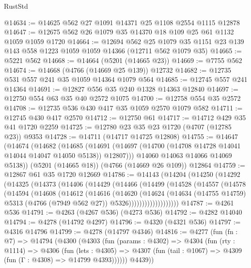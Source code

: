 \begin{lexlean}{RustStd}
\begin{coremodule}
{\begin{coremodule}
{{{{{{{{{{{{{{{{{{{{{{{{{{{{{{{{{{{@14634 := @14625 @562 @27 @1091 @14371 @25 @1108 @2554 @1115 @12878
@14647 := @12675 @562 @26 @1079 @35 @14370 @18 @109 @25 @61 @1132 @1059 @1059 @1720
@14664 := @12694
    @562
    @25
    @1079
    @35
    @1151
    @23
    @139
    @143
    @558
    @1223
    @1059
    @1059
    @14366
    (@12711 @562 @1079 @35)
@14665 := @5221 @562
@14668 := @14664 (@5201 (@14665 @23))
@14669 := @7755 @562
@14674 := @14668 (@4766 (@14669 @25 @139)) @12732
@14682 := @12735 @531 @557 @241 @35 @1059 @14364 @1079 @564
@14685 := @12745 @557 @241 @14364
@14691 := @12827 @556 @35 @240 @1328 @14363 @12840
@14697 := @12750 @554 @63 @35 @40 @2572 @1075
@14700 := @12758 @554 @35 @2572
@14708 := @12735 @536 @430 @417 @35 @1059 @2570 @1079 @582
@14711 := @12745 @430 @417 @2570
@14712 := @12750 @61
@14717 := @14712 @429 @35 @41 @1720 @2259
@14725 := @12780 @23 @35 @23 @1720 (@4707 (@12785 @23)) @9353
@14728 := @14711 (@14717 @14725 @12808)
@14755 := @14647
    (@14674
      (@14682
        (@14685 (@14691 (@14697 (@14700 (@14708 @14728 @14041 @14044 @14047 @14050 @5138)) @12807)))
        @14060
        @14063
        @14066
        @14069
        @5138))
    (@5201 (@14665 @18))
    (@4766 (@14669 @26 @109))
    @12864
@14759 := @12867 @61 @35 @1720 @12669
@14786 := @14143
    (@14204
      (@14250
        (@14292
          (@14325
            (@14373
              (@14406
                (@14429
                  (@14466
                    (@14499
                      (@14528
                        (@14557
                          (@14578
                            (@14594
                              (@14608
                                (@14612
                                  (@14616
                                    (@14620
                                      (@14624
                                        (@14634
                                          (@14755 @14759)
                                          @5313
                                          (@4766 (@7949 @562 @27))
                                          @5326)))))))))))))))))))
@14787 := @4261 @536
@14791 := @4263 (@4267 @536) (@4273 @536)
@14792 := @4282 @14040
@14794 := @4278 (@14792 @4297)
@14796 := @4320 (@4321 @536)
@14797 := @4316 @14796
@14799 := @4278 (@14797 @4346)
@14816 := @4277
    (fun (fn : @7) =>
    @14794
      (@4300
        (@4303
          (fun (params : @4302) =>
          @4304
            (fun (rty : @1114) =>
            @4306
              (fun (lets : @4305) =>
              @4307 (fun (tail : @1067) => @4309 (fun (Γ : @4308) => @14799 @4393))))))
        @4439))
}}}}}}}}}}}}}}}}}}}}}}}}}}}}}}}}}}}
\end{coremodule}}
\end{coremodule}
\end{lexlean}
